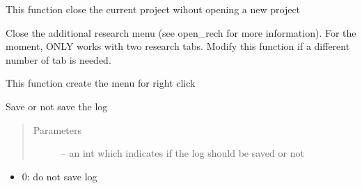 \documentclass[letterpaper,10pt,english]{sphinxmanual}
\begin{document}
\begin{fulllineitems}
\begin{fulllineitems}
\end{fulllineitems}


\begin{fulllineitems}
\label{\detokenize{index:src_GUI.Main_windows_1.MainWindows.close_project}}
This function close the current project wihout opening a new project

\end{fulllineitems}


\begin{fulllineitems}
\label{\detokenize{index:src_GUI.Main_windows_1.MainWindows.close_rech}}
Close the additional research menu (see open\_rech for more information). For the moment, ONLY works with
two research tabs. Modify this function if a different number of tab is needed.

\end{fulllineitems}


\begin{fulllineitems}
\label{\detokenize{index:src_GUI.Main_windows_1.MainWindows.create_menu_right}}
This function create the menu for right click

\end{fulllineitems}


\begin{fulllineitems}
\label{\detokenize{index:src_GUI.Main_windows_1.MainWindows.do_log}}
Save or not save the log
\begin{quote}\begin{description}
\item[{Parameters}] \leavevmode
{} -- an int which indicates if the log should be saved or not

\end{description}\end{quote}
\begin{itemize}
\item {} 
0: do not save log


\end{itemize}
\end{fulllineitems}
\end{fulllineitems}
\end{document}
